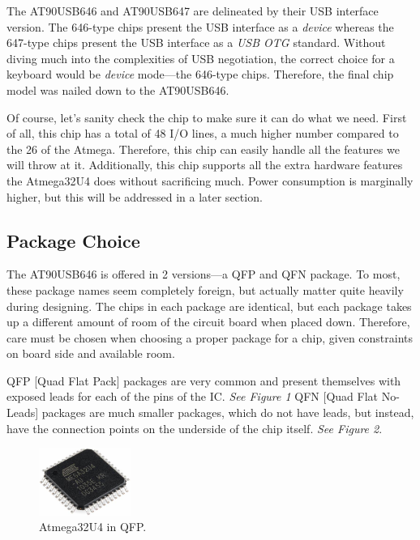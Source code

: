 \documentclass[11pt]{article}
\begin{document}
The AT90USB646 and AT90USB647 are delineated by their USB interface version. The 646-type chips present the USB interface as a \emph{device} whereas the 647-type chips present the USB interface as a \emph{USB OTG} standard. Without diving much into the complexities of USB negotiation, the correct choice for a keyboard would be \emph{device} mode—the 646-type chips. Therefore, the final chip model was nailed down to the AT90USB646.

Of course, let's sanity check the chip to make sure it can do what we need. First of all, this chip has a total of 48 I/O lines, a much higher number compared to the 26 of the Atmega. Therefore, this chip can easily handle all the features we will throw at it. Additionally, this chip supports all the extra hardware features the Atmega32U4 does without sacrificing much. Power consumption is marginally higher, but this will be addressed in a later section.\footnotemark {}

\subsection{Package Choice}

The AT90USB646 is offered in 2 versions—a QFP and QFN package. To most, these package names seem completely foreign, but actually matter quite heavily during designing. The chips in each package are identical, but each package takes up a different amount of room of the circuit board when placed down. Therefore, care must be chosen when choosing a proper package for a chip, given constraints on board side and available room.

QFP [Quad Flat Pack] packages are very common and present themselves with exposed leads for each of the pins of the IC. \emph{See Figure 1} QFN [Quad Flat No-Leads] packages are much smaller packages, which do not have leads, but instead, have the connection points on the underside of the chip itself. \emph{See Figure 2}. 

\begin{figure}
	\centering
	\includegraphics[width=3cm]{images/atmega32u4-qfp}
	\caption{Atmega32U4 in QFP.}
\end{figure}
\end{document}
